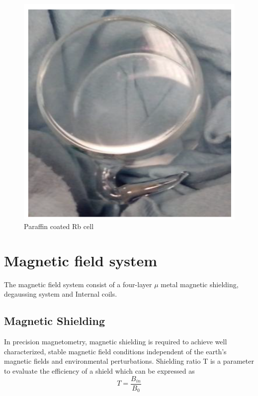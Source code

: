 \begin{figure}[h]
\centering
\includegraphics[width=0.5\linewidth]{figures/cell}
\caption{Paraffin coated Rb cell}
\end{figure}
\section{Magnetic field system}
The magnetic field system consist of a four-layer $\mu$ metal magnetic shielding, degaussing system and Internal coils.
\subsection{Magnetic Shielding}
In precision magnetometry, magnetic shielding is required to achieve well characterized, stable magnetic field conditions independent of the earth’s magnetic fields and environmental perturbations. Shielding ratio T is a parameter to evaluate the efficiency of a shield which can be expressed as
\begin{equation}
 T = \frac{B_{in} }{B_0} 
\end{equation}

